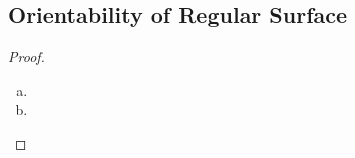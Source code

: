 
{

\subsection{Orientability of Regular Surface}


\begin{proof}
\begin{enumerate}[(a)]
	\item
	\item
\end{enumerate}
\end{proof}

}
